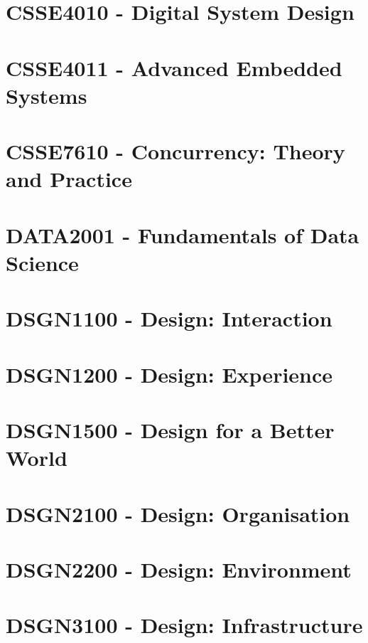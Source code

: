 \documentclass[a4paper,12pt]{report}
\begin{document}
\hypertarget{CSSE4010}{\section{CSSE4010 - Digital System Design}}

\hypertarget{CSSE4011}{\section{CSSE4011 - Advanced Embedded Systems}}

\hypertarget{CSSE7610}{\section{CSSE7610 - Concurrency: Theory and Practice}}

\hypertarget{DATA2001}{\section{DATA2001 - Fundamentals of Data Science}}

\hypertarget{DSGN1100}{\section{DSGN1100 - Design: Interaction}}

\hypertarget{DSGN1200}{\section{DSGN1200 - Design: Experience}}

\hypertarget{DSGN1500}{\section{DSGN1500 - Design for a Better World}}

\hypertarget{DSGN2100}{\section{DSGN2100 - Design: Organisation}}

\hypertarget{DSGN2200}{\section{DSGN2200 - Design: Environment}}

\hypertarget{DSGN3100}{\section{DSGN3100 - Design: Infrastructure}}
\end{document}
